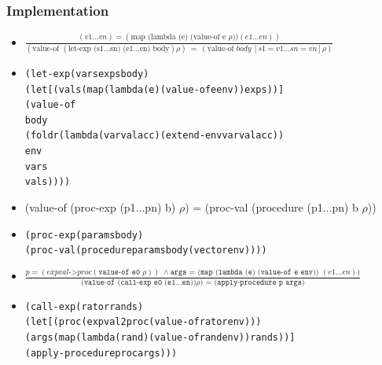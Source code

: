 \documentclass{beamer}
\newcommand{\dotss}{\(\ldots\)}
\begin{document}
\begin{frame}[fragile]
\frametitle{Implementation}
\begin{scriptsize}
\begin{itemize}
\item<1->
$\frac{(v1\ldots vn) = (\text{map (lambda (e) (value-of e $\rho$))} (e1\dots en))}
      {(\text{value-of } (\text{let-exp (s1\ldots sn) (e1\ldots en) body}) \rho) \ = \ (\text{value-of } body \ [s1=v1\ldots sn=vn]\rho)}$

\item<2->
\begin{alltt}
(let-exp (vars exps body)
  (let [(vals (map (lambda (e) (value-of e env)) exps))]
    (value-of
      body
      (foldr (lambda (var val acc) (extend-env var val acc))
             env
             vars
             vals))))
\end{alltt}

\item<3-> (value-of (proc-exp (p1\dotss{}pn) b) $\rho$) = (proc-val (procedure (p1\dotss{}pn) b $\rho$))

\item<4->
\begin{alltt}
(proc-exp (params body)
  (proc-val (procedure params body (vector env))))
\end{alltt}

\item<5->
$\frac{p = (expval\texttt{->}proc (\texttt{value-of e0 } \rho)) \ \wedge{} \texttt{args = (map (lambda (e) (value-of e env)) }(e1\ldots{}en))}
      {\texttt{(value-of (call-exp e0 (e1} \ldots \texttt{en))} \rho) \texttt{ = (apply-procedure p args)}}$

\item<6->
\begin{alltt}
(call-exp (rator rands)
  (let [(proc (expval2proc (value-of rator env)))
        (args (map (lambda (rand) (value-of rand env)) rands))]
    (apply-procedure proc args)))
\end{alltt}

\end{itemize}
\end{scriptsize}
\end{frame}
\end{document}
